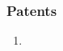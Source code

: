 \documentclass[11pt]{article}
\begin{document}
    \subsubsection{Patents}
    \begin{enumerate}
      \item {}
    \end{enumerate}




\end{document}
